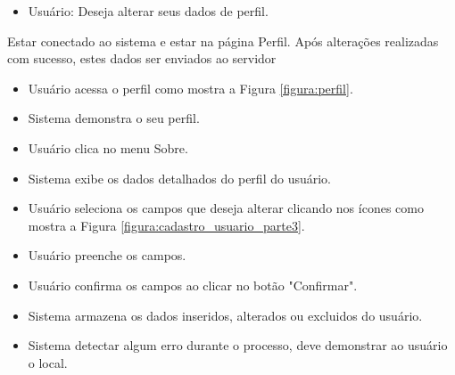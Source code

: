 {
\begin{itemize}
	\item Usuário: Deseja alterar seus dados de perfil.	
\end{itemize}
}
{Estar conectado ao sistema e estar na página Perfil.}
{Após alterações realizadas com sucesso, estes dados ser enviados ao servidor}
{
\begin{itemize}
	\item Usuário acessa o perfil como mostra a Figura \ref{figura:perfil}.
	\item Sistema demonstra o seu perfil.
	\item Usuário clica no menu Sobre.
 	\item Sistema exibe os dados detalhados do perfil do usuário.
	\item Usuário seleciona os campos que deseja alterar clicando nos ícones como mostra a Figura \ref{figura:cadastro_usuario_parte3}.
	\item Usuário preenche os campos.
	\item Usuário confirma os campos ao clicar no botão "Confirmar".
	\item Sistema armazena os dados inseridos, alterados ou excluidos do usuário.
	\item Sistema detectar algum erro durante o processo, deve demonstrar ao usuário o local.
\end{itemize}
}
